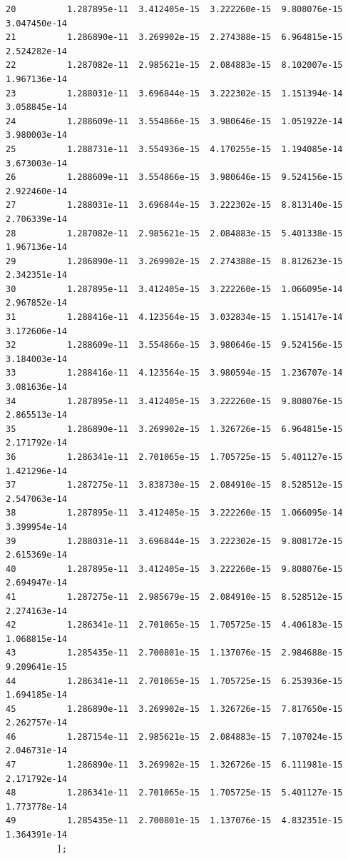 \documentclass[a4paper,10pt]{report}%
\begin{document}
\begin{lstlisting}
20          1.287895e-11  3.412405e-15  3.222260e-15  9.808076e-15  3.047450e-14
21          1.286890e-11  3.269902e-15  2.274388e-15  6.964815e-15  2.524282e-14
22          1.287082e-11  2.985621e-15  2.084883e-15  8.102007e-15  1.967136e-14
23          1.288031e-11  3.696844e-15  3.222302e-15  1.151394e-14  3.058845e-14
24          1.288609e-11  3.554866e-15  3.980646e-15  1.051922e-14  3.980003e-14
25          1.288731e-11  3.554936e-15  4.170255e-15  1.194085e-14  3.673003e-14
26          1.288609e-11  3.554866e-15  3.980646e-15  9.524156e-15  2.922460e-14
27          1.288031e-11  3.696844e-15  3.222302e-15  8.813140e-15  2.706339e-14
28          1.287082e-11  2.985621e-15  2.084883e-15  5.401338e-15  1.967136e-14
29          1.286890e-11  3.269902e-15  2.274388e-15  8.812623e-15  2.342351e-14
30          1.287895e-11  3.412405e-15  3.222260e-15  1.066095e-14  2.967852e-14
31          1.288416e-11  4.123564e-15  3.032834e-15  1.151417e-14  3.172606e-14
32          1.288609e-11  3.554866e-15  3.980646e-15  9.524156e-15  3.184003e-14
33          1.288416e-11  4.123564e-15  3.980594e-15  1.236707e-14  3.081636e-14
34          1.287895e-11  3.412405e-15  3.222260e-15  9.808076e-15  2.865513e-14
35          1.286890e-11  3.269902e-15  1.326726e-15  6.964815e-15  2.171792e-14
36          1.286341e-11  2.701065e-15  1.705725e-15  5.401127e-15  1.421296e-14
37          1.287275e-11  3.838730e-15  2.084910e-15  8.528512e-15  2.547063e-14
38          1.287895e-11  3.412405e-15  3.222260e-15  1.066095e-14  3.399954e-14
39          1.288031e-11  3.696844e-15  3.222302e-15  9.808172e-15  2.615369e-14
40          1.287895e-11  3.412405e-15  3.222260e-15  9.808076e-15  2.694947e-14
41          1.287275e-11  2.985679e-15  2.084910e-15  8.528512e-15  2.274163e-14
42          1.286341e-11  2.701065e-15  1.705725e-15  4.406183e-15  1.068815e-14
43          1.285435e-11  2.700801e-15  1.137076e-15  2.984688e-15  9.209641e-15
44          1.286341e-11  2.701065e-15  1.705725e-15  6.253936e-15  1.694185e-14
45          1.286890e-11  3.269902e-15  1.326726e-15  7.817650e-15  2.262757e-14
46          1.287154e-11  2.985621e-15  2.084883e-15  7.107024e-15  2.046731e-14
47          1.286890e-11  3.269902e-15  1.326726e-15  6.111981e-15  2.171792e-14
48          1.286341e-11  2.701065e-15  1.705725e-15  5.401127e-15  1.773778e-14
49          1.285435e-11  2.700801e-15  1.137076e-15  4.832351e-15  1.364391e-14
          ];
\end{lstlisting}
\end{document}
